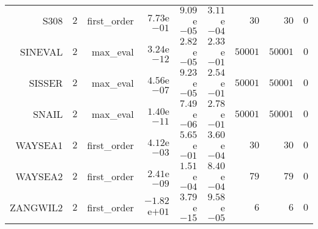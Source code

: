 \begin{longtable}{rrrrrrrrr}
S308 & \(     2\) & first\_order & \( 7.73\)e\(-01\) & \( 9.09\)e\(-05\) & \( 3.11\)e\(-04\) & \(    30\) & \(    30\) & \(     0\) \\
SINEVAL & \(     2\) & max\_eval & \( 3.24\)e\(-12\) & \( 2.82\)e\(-05\) & \( 2.33\)e\(-01\) & \( 50001\) & \( 50001\) & \(     0\) \\
SISSER & \(     2\) & max\_eval & \( 4.56\)e\(-07\) & \( 9.23\)e\(-05\) & \( 2.54\)e\(-01\) & \( 50001\) & \( 50001\) & \(     0\) \\
SNAIL & \(     2\) & max\_eval & \( 1.40\)e\(-11\) & \( 7.49\)e\(-06\) & \( 2.78\)e\(-01\) & \( 50001\) & \( 50001\) & \(     0\) \\
WAYSEA1 & \(     2\) & first\_order & \( 4.12\)e\(-03\) & \( 5.65\)e\(-01\) & \( 3.60\)e\(-04\) & \(    30\) & \(    30\) & \(     0\) \\
WAYSEA2 & \(     2\) & first\_order & \( 2.41\)e\(-09\) & \( 1.51\)e\(-04\) & \( 8.40\)e\(-04\) & \(    79\) & \(    79\) & \(     0\) \\
ZANGWIL2 & \(     2\) & first\_order & \(-1.82\)e\(+01\) & \( 3.79\)e\(-15\) & \( 9.58\)e\(-05\) & \(     6\) & \(     6\) & \(     0\) \\\hline
\end{longtable}
